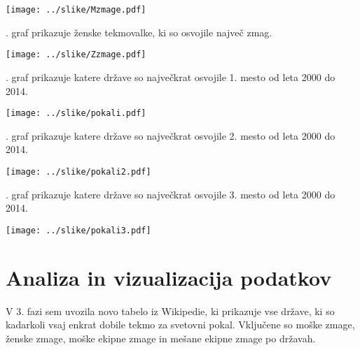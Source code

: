 \documentclass[11pt,a4paper]{article}
\begin{document}
\texttt{[image: ../slike/Mzmage.pdf]}

. graf prikazuje ženske tekmovalke, ki so osvojile največ zmag.

\texttt{[image: ../slike/Zzmage.pdf]}

. graf prikazuje katere države so največkrat osvojile 1. mesto od leta 2000 do 2014.

\texttt{[image: ../slike/pokali.pdf]}

. graf prikazuje katere države so največkrat osvojile 2. mesto od leta 2000 do 2014.

\texttt{[image: ../slike/pokali2.pdf]}

. graf prikazuje katere države so največkrat osvojile 3. mesto od leta 2000 do 2014.

\texttt{[image: ../slike/pokali3.pdf]}

\newpage
\section{Analiza in vizualizacija podatkov}
V 3. fazi sem uvozila novo tabelo iz Wikipedie, ki prikazuje vse države, ki so kadarkoli vsaj enkrat dobile tekmo za svetovni pokal. Vključene so moške zmage, ženske zmage, moške ekipne zmage in mešane ekipne zmage po državah.




\end{document}
